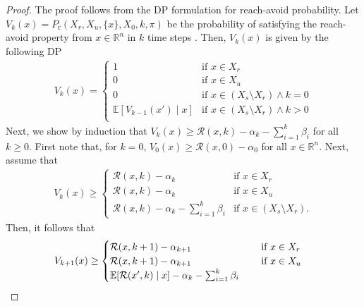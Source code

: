 \documentclass[journal,twoside,web]{ieeecolor}
\newcommand{\reach}{\mathrm{r}}
\newcommand{\reals}{\mathbb{R}}
\newcommand{\RA}{\mathcal{R}}
\theoremstyle{definition}
\theoremstyle{plain}
\theoremstyle{plain}
\begin{document}
\begin{proof}
    The proof follows from the DP formulation for reach-avoid probability.  Let 
    $V_k(x) = P_\reach(X_r, X_u, \{x\}, X_0, k, \pi)$ be the probability of satisfying the reach-avoid property from $x \in \reals^n$ in $k$ time steps \cite{wicker2024probabilistic}.  Then, $V_k(x)$ is given by the following DP
    \begin{align}
        \label{eq: value function}
        V_{k}(x) = 
        \begin{cases}
           1 & \text{if } x \in X_r\\
           0 & \text{if } x \in X_u\\
           0 & \text{if } x \in (X_s \setminus X_r) \land k = 0\\
           \mathbb{E}[V_{k-1}(x') \mid x] & \text{if } x \in (X_s \setminus X_r) \land k > 0\\
        \end{cases}
    \end{align}
    Next, we show by induction that $V_k (x) \geq \RA(x,k) - \alpha_k - \sum_{i=1}^k \beta_i$ for all $k \geq 0$.
    First note that, for $k = 0$, $V_0(x) \geq \RA(x,0) - \alpha_0$ for all $x \in \reals^n$.  
    Next, assume that
    \begin{align*}
        V_{k}(x) \geq 
            \begin{cases}
               \RA(x,k) - \alpha_k & \text{if } x \in X_r\\
               \RA(x,k) - \alpha_k & \text{if } x \in X_u\\
               \RA(x,k) - \alpha_k - \sum_{i=1}^{k} \beta_i & \text{if } x \in (X_s \setminus X_r).
            \end{cases}
    \end{align*}
    Then, it follows that 
    \begin{align*}
    V_{k+1}(x) \geq 
        \begin{cases}
           \RA(x,k+1) - \alpha_{k+1} \hspace{25mm}  \text{if } x \in X_r\\
           \RA(x,k+1) - \alpha_{k+1} \hspace{25mm}  \text{if } x \in X_u\\
           \mathbb{E}[\RA(x',k) \mid x] - \alpha_k - \sum_{i=1}^{k} \beta_i  

\end{cases}
\end{align*}
\end{proof}
\end{document}
